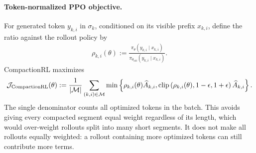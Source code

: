 \paragraph{Token-normalized PPO objective.}
For generated token $y_{k,i}$ in $\sigma_k$, conditioned on its visible prefix
$x_{k,i}$, define the ratio against the rollout policy by
\begin{align}
    \rho_{k,i}(\theta)
    :=
    \frac{\pi_\theta(y_{k,i}\mid x_{k,i})}
         {\pi_{\theta_{\mathrm{old}}}(y_{k,i}\mid x_{k,i})}.
\end{align}
CompactionRL maximizes
\begin{align}
    {\cal J}_{\mathrm{CompactionRL}}(\theta)
    :=
    \frac{1}{\lvert{\cal M}\rvert}
    \sum_{(k,i)\in{\cal M}}
    \min\left\{
        \rho_{k,i}(\theta)\widehat A_{k,i},
        \operatorname{clip}\left(
            \rho_{k,i}(\theta),1-\epsilon,1+\epsilon
        \right)\widehat A_{k,i}
    \right\}.
    \label{eq:compactionrl.objective}
\end{align}
The single denominator counts all optimized tokens in the batch.  This avoids
giving every compacted segment equal weight regardless of its length, which
would over-weight rollouts split into many short segments.  It does not make
all rollouts equally weighted: a rollout containing more optimized tokens can
still contribute more terms.

